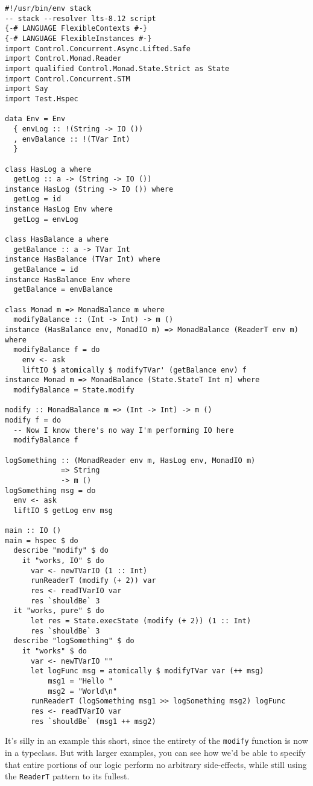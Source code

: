 \begin{verbatim}
#!/usr/bin/env stack
-- stack --resolver lts-8.12 script
{-# LANGUAGE FlexibleContexts #-}
{-# LANGUAGE FlexibleInstances #-}
import Control.Concurrent.Async.Lifted.Safe
import Control.Monad.Reader
import qualified Control.Monad.State.Strict as State
import Control.Concurrent.STM
import Say
import Test.Hspec

data Env = Env
  { envLog :: !(String -> IO ())
  , envBalance :: !(TVar Int)
  }

class HasLog a where
  getLog :: a -> (String -> IO ())
instance HasLog (String -> IO ()) where
  getLog = id
instance HasLog Env where
  getLog = envLog

class HasBalance a where
  getBalance :: a -> TVar Int
instance HasBalance (TVar Int) where
  getBalance = id
instance HasBalance Env where
  getBalance = envBalance

class Monad m => MonadBalance m where
  modifyBalance :: (Int -> Int) -> m ()
instance (HasBalance env, MonadIO m) => MonadBalance (ReaderT env m) where
  modifyBalance f = do
    env <- ask
    liftIO $ atomically $ modifyTVar' (getBalance env) f
instance Monad m => MonadBalance (State.StateT Int m) where
  modifyBalance = State.modify

modify :: MonadBalance m => (Int -> Int) -> m ()
modify f = do
  -- Now I know there's no way I'm performing IO here
  modifyBalance f

logSomething :: (MonadReader env m, HasLog env, MonadIO m)
             => String
             -> m ()
logSomething msg = do
  env <- ask
  liftIO $ getLog env msg

main :: IO ()
main = hspec $ do
  describe "modify" $ do
    it "works, IO" $ do
      var <- newTVarIO (1 :: Int)
      runReaderT (modify (+ 2)) var
      res <- readTVarIO var
      res `shouldBe` 3
  it "works, pure" $ do
      let res = State.execState (modify (+ 2)) (1 :: Int)
      res `shouldBe` 3
  describe "logSomething" $ do
    it "works" $ do
      var <- newTVarIO ""
      let logFunc msg = atomically $ modifyTVar var (++ msg)
          msg1 = "Hello "
          msg2 = "World\n"
      runReaderT (logSomething msg1 >> logSomething msg2) logFunc
      res <- readTVarIO var
      res `shouldBe` (msg1 ++ msg2)
\end{verbatim}
It's silly in an example this short, since the entirety of the
\texttt{modify} function is now in a typeclass. But with larger
examples, you can see how we'd be able to specify that entire portions
of our logic perform no arbitrary side-effects, while still using the
\texttt{ReaderT} pattern to its fullest.

